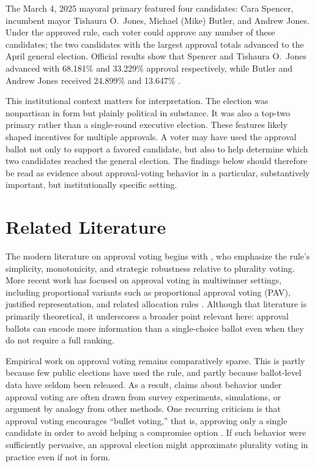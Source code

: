 \documentclass[11pt]{article}
\begin{document}
The March 4, 2025 mayoral primary featured four candidates: Cara Spencer, incumbent mayor Tishaura O.~Jones, Michael (Mike) Butler, and Andrew Jones. Under the approved rule, each voter could approve any number of these candidates; the two candidates with the largest approval totals advanced to the April general election. Official results show that Spencer and Tishaura O.~Jones advanced with 68.181\% and 33.229\% approval respectively, while Butler and Andrew Jones received 24.899\% and 13.647\% \citep{stlresults2025, sargent2025stl}.

This institutional context matters for interpretation. The election was nonpartisan in form but plainly political in substance. It was also a top-two primary rather than a single-round executive election. These features likely shaped incentives for multiple approvals. A voter may have used the approval ballot not only to support a favored candidate, but also to help determine which two candidates reached the general election. The findings below should therefore be read as evidence about approval-voting behavior in a particular, substantively important, but institutionally specific setting.

\section{Related Literature}
The modern literature on approval voting begins with \citet{brams2007approval}, who emphasize the rule's simplicity, monotonicity, and strategic robustness relative to plurality voting. More recent work has focused on approval voting in multiwinner settings, including proportional variants such as proportional approval voting (PAV), justified representation, and related allocation rules \citep{aziz2017jr, brams2022excess}. Although that literature is primarily theoretical, it underscores a broader point relevant here: approval ballots can encode more information than a single-choice ballot even when they do not require a full ranking.

Empirical work on approval voting remains comparatively sparse. This is partly because few public elections have used the rule, and partly because ballot-level data have seldom been released. As a result, claims about behavior under approval voting are often drawn from survey experiments, simulations, or argument by analogy from other methods. One recurring criticism is that approval voting encourages ``bullet voting,'' that is, approving only a single candidate in order to avoid helping a compromise option \citep{fairvote_comparison}. If such behavior were sufficiently pervasive, an approval election might approximate plurality voting in practice even if not in form.
\end{document}
